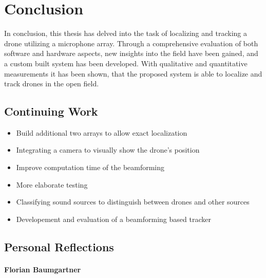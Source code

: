 \chapter{Conclusion}
In conclusion, this thesis has delved into the task of
localizing and tracking a drone utilizing a microphone array.
Through a comprehensive evaluation of both software and hardware aspects,
new insights into the field have been gained, and
a custom built system has been developed.
With qualitative and quantitative measurements it has been shown,
that the proposed system is able to localize and track
drones in the open field.

\section{Continuing Work}

\bigskip
\begin{itemize}
	\item Build additional two arrays to allow exact localization
	\item Integrating a camera to visually show the drone's position
	\item Improve computation time of the beamforming
	\item More elaborate testing
	\item Classifying sound sources to distinguish between drones and other sources
	\item Developement and evaluation of a beamforming based tracker
\end{itemize}
\newpage

\newpage
\section{Personal Reflections}
\subsubsection{Florian Baumgartner}

